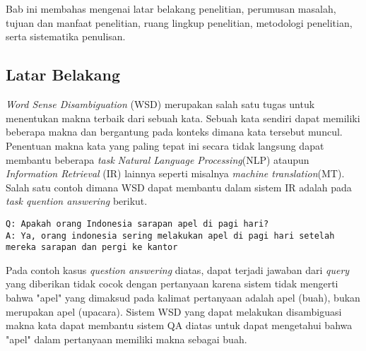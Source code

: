 \chapter{\babSatu}
Bab ini membahas mengenai latar belakang penelitian, perumusan masalah, tujuan dan manfaat penelitian, ruang lingkup penelitian, metodologi penelitian, serta sistematika penulisan.

\section{Latar Belakang}

\textit{Word Sense Disambiguation} (WSD) merupakan salah satu tugas untuk menentukan makna terbaik dari sebuah kata. Sebuah kata sendiri dapat memiliki beberapa makna dan bergantung pada konteks dimana kata tersebut muncul. Penentuan makna kata yang paling tepat ini secara tidak langsung dapat membantu beberapa \textit{task} \textit{Natural Language Processing}(NLP) ataupun \textit{Information Retrieval} (IR) lainnya seperti misalnya \textit{machine translation}(MT). Salah satu contoh dimana WSD dapat membantu dalam sistem IR adalah pada \textit{task quention answering} berikut.

\begin{lstlisting}
Q: Apakah orang Indonesia sarapan apel di pagi hari?
A: Ya, orang indonesia sering melakukan apel di pagi hari setelah mereka sarapan dan pergi ke kantor 
\end{lstlisting}
Pada contoh kasus \textit{question answering} diatas, dapat terjadi jawaban dari \textit{query} yang diberikan tidak cocok dengan pertanyaan karena sistem tidak mengerti bahwa "apel" yang dimaksud pada kalimat pertanyaan adalah apel (buah), bukan merupakan apel (upacara). Sistem WSD yang dapat melakukan disambiguasi makna kata dapat membantu sistem QA diatas untuk dapat mengetahui bahwa "apel" dalam pertanyaan memiliki makna sebagai buah.

